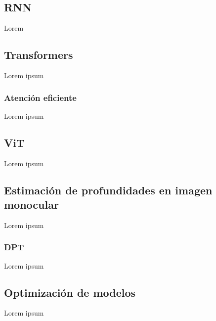 \subsection{RNN}
Lorem

\subsection{Transformers}
Lorem ipsum

\subsubsection{Atención eficiente}
Lorem ipsum

\subsection{ViT}
Lorem ipsum

\subsection{Estimación de profundidades en imagen monocular}
Lorem ipsum

\subsubsection{DPT}
Lorem ipsum

\subsection{Optimización de modelos}
Lorem ipsum

\clearpage